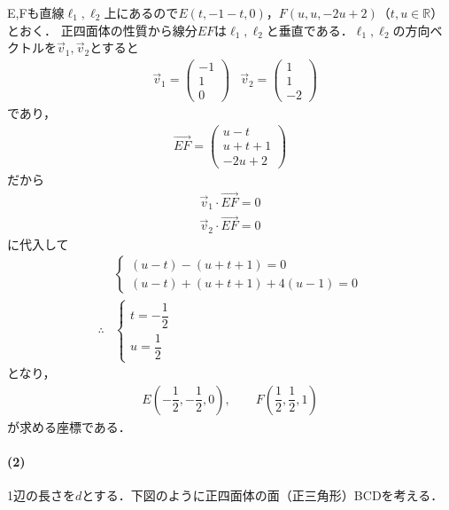 \documentclass[../../main.tex]{subfiles}
\begin{document}
E,Fも直線$\ell_1,\ell_2$上にあるので$E(t,-1-t,0)$，$F(u,u,-2u+2)$（$t,u\in\mathbb{R}$）とおく．
正四面体の性質から線分$EF$は$\ell_1,\ell_2$と垂直である．$\ell_1,\ell_2$の方向ベクトルを$\vec{v}_1, \vec{v}_2$とすると
\begin{align}
  &\vec{v}_1 =
  \begin{pmatrix}-1\\1\\0
  \end{pmatrix} &\vec{v}_2=
  \begin{pmatrix}1\\1\\-2
  \end{pmatrix}
\end{align}
であり，
\begin{align}
  \overrightarrow{EF}=
  \begin{pmatrix}u-t\\u+t+1\\-2u+2
  \end{pmatrix}
\end{align}
だから
\begin{align}
  \vec{v}_1\cdot \overrightarrow{EF} = 0 \\
  \vec{v}_2\cdot \overrightarrow{EF} = 0
\end{align}
に代入して
\begin{align}
  &
  \begin{cases}\displaystyle
    (u-t)-(u+t+1)=0 \\
    (u-t)+(u+t+1)+4(u-1)=0
  \end{cases} \\
  \therefore
  &
  \begin{cases}\displaystyle
    t=-\dfrac{1}{2} \\
    u=\dfrac{1}{2}
  \end{cases}
\end{align}
となり，
\begin{align}
  E\left(-\dfrac{1}{2},-\dfrac{1}{2},0\right), \qquad F\left(\dfrac{1}{2},\dfrac{1}{2},1\right) \label{eq:1}
\end{align}
が求める座標である．

\paragraph{(2)}
1辺の長さを$d$とする．下図のように正四面体の面（正三角形）BCDを考える．
\end{document}
